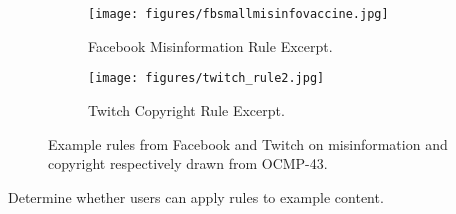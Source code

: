 \begin{figure}[t]
        \centering
        \begin{subfigure}{0.4\textwidth}
            \texttt{[image: figures/fbsmallmisinfovaccine.jpg]}
            \caption{Facebook Misinformation Rule Excerpt.}
            \label{fig:FBmisinforule}
        \end{subfigure}
        \hfill
        \begin{subfigure}{0.4\textwidth}
            \texttt{[image: figures/twitch\_rule2.jpg]}
            \caption{Twitch Copyright Rule Excerpt.}
            \label{fig:Twitchcopyrightrule}
        \end{subfigure}
        
        \caption{Example rules from Facebook and Twitch on misinformation and copyright respectively drawn from OCMP-43.}
        \label{fig:example_rules_OMCP43}
        \end{figure}
\fi



\begin{task}
Determine whether users can apply rules to example content.
\end{task}


